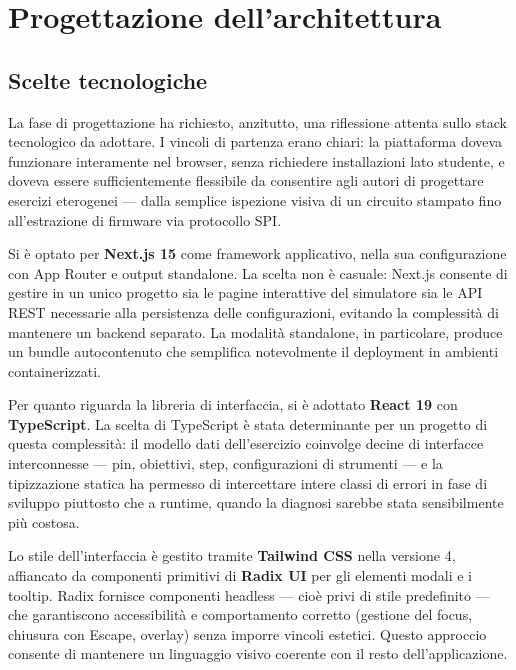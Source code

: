 \chapter{Progettazione dell'architettura}
\label{ch:progettazione}

\section{Scelte tecnologiche}
\label{sec:scelte-tecnologiche}

La fase di progettazione ha richiesto, anzitutto, una riflessione attenta sullo stack tecnologico da adottare. I vincoli di partenza erano chiari: la piattaforma doveva funzionare interamente nel browser, senza richiedere installazioni lato studente, e doveva essere sufficientemente flessibile da consentire agli autori di progettare esercizi eterogenei --- dalla semplice ispezione visiva di un circuito stampato fino all'estrazione di firmware via protocollo SPI.

Si è optato per \textbf{Next.js 15} come framework applicativo, nella sua configurazione con App Router e output standalone. La scelta non è casuale: Next.js consente di gestire in un unico progetto sia le pagine interattive del simulatore sia le API REST necessarie alla persistenza delle configurazioni, evitando la complessità di mantenere un backend separato. La modalità standalone, in particolare, produce un bundle autocontenuto che semplifica notevolmente il deployment in ambienti containerizzati.

Per quanto riguarda la libreria di interfaccia, si è adottato \textbf{React 19} con \textbf{TypeScript}. La scelta di TypeScript è stata determinante per un progetto di questa complessità: il modello dati dell'esercizio coinvolge decine di interfacce interconnesse --- pin, obiettivi, step, configurazioni di strumenti --- e la tipizzazione statica ha permesso di intercettare intere classi di errori in fase di sviluppo piuttosto che a runtime, quando la diagnosi sarebbe stata sensibilmente più costosa.

Lo stile dell'interfaccia è gestito tramite \textbf{Tailwind CSS} nella versione 4, affiancato da componenti primitivi di \textbf{Radix UI} per gli elementi modali e i tooltip. Radix fornisce componenti headless --- cioè privi di stile predefinito --- che garantiscono accessibilità e comportamento corretto (gestione del focus, chiusura con Escape, overlay) senza imporre vincoli estetici. Questo approccio consente di mantenere un linguaggio visivo coerente con il resto dell'applicazione.

